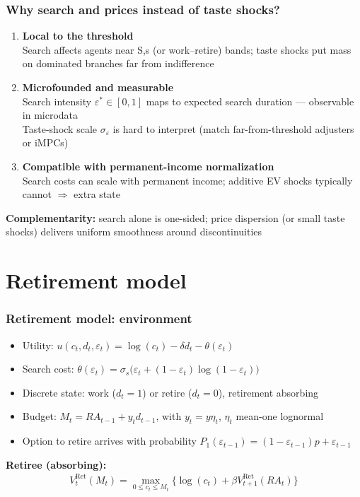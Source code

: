 \documentclass[aspectratio=169]{beamer}
\newcommand{\Ret}{\mathrm{Ret}}
\newcommand{\eff}{\varepsilon}
\begin{document}
\begin{frame}[label = WhySearch]
	\frametitle{Why search and prices instead of taste shocks?}
	\begin{enumerate}\setlength\itemsep{0.9em}
		\item \textbf{Local to the threshold}\\
		Search affects agents near S,s (or work--retire) bands; taste shocks put mass on dominated branches far from indifference
		\item \textbf{Microfounded and measurable}\\
		Search intensity $\varepsilon^\ast\in[0,1]$ maps to expected search duration --- observable in microdata\\
		Taste-shock scale $\sigma_\varepsilon$ is hard to interpret (match far-from-threshold adjusters or iMPCs)
		\item \textbf{Compatible with permanent-income normalization}\\
		Search costs can scale with permanent income; additive EV shocks typically cannot $\Rightarrow$ extra state
	\end{enumerate}
	\vspace{0.75em}
	\pause
	\textbf{Complementarity:} search alone is one-sided; price dispersion (or small taste shocks) delivers uniform smoothness around discontinuities
\end{frame}


\section{Retirement model}

\begin{frame}[label = RetBasic]
	\frametitle{Retirement model: environment}
	\begin{itemize}
		\item Utility: $u(c_t,d_t,\eff_t)=\log(c_t)-\delta d_t-\theta(\eff_t)$
		\item Search cost: $\theta(\eff_t)=\sigma_s\big(\eff_t+(1-\eff_t)\log(1-\eff_t)\big)$
		\item Discrete state: work ($d_t=1$) or retire ($d_t=0$), retirement absorbing
		\item Budget: $M_t=R A_{t-1}+y_t d_{t-1}$, with $y_t=y\eta_t$, $\eta_t$ mean-one lognormal
		\item Option to retire arrives with probability $P_1(\eff_{t-1})=(1-\eff_{t-1})p+\eff_{t-1}$
	\end{itemize}
	\vspace{0.5em}
	\pause
	\textbf{Retiree (absorbing):}
	\begin{align*}
		V_t^{\Ret}(M_t)=\max_{0\le c_t\le M_t}\big\{\log(c_t)+\beta V_{t+1}^{\Ret}(R A_t)\big\}
	\end{align*}
\end{frame}
\end{document}
